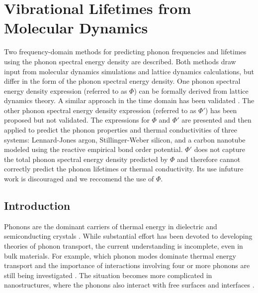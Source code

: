 \chapter{\label{Chapter:SED}Vibrational Lifetimes from Molecular Dynamics}

Two frequency-domain methods for predicting phonon frequencies and 
lifetimes
using the phonon spectral energy density are described. Both methods draw
input from molecular dynamics simulations and lattice dynamics 
calculations,
but differ in the form of the phonon spectral energy density.
One phonon spectral energy density expression (referred to as $\Phi$) 
can be
formally derived from lattice dynamics theory. A similar approach in the
time domain has been validated \cite{turney_predicting_2009}. 
The other phonon spectral energy density expression 
(referred to as
$\Phi'$) has been proposed \cite{thomas_predicting_2010}
but not validated. The expressions for $\Phi$ and $\Phi'$ are 
presented and then
applied to predict the phonon properties and thermal conductivities 
of three
systems: Lennard-Jones argon, Stillinger-Weber silicon, and a carbon
nanotube modeled using the reactive empirical bond order potential. 
$\Phi'$ does not capture the total
phonon spectral energy density predicted by $\Phi$ and therefore 
cannot
correctly predict the phonon lifetimes or thermal conductivity. Its 
use infuture work is discouraged and we reccomend the use of $\Phi$.

\section{\label{Section_Introduction}Introduction}
Phonons are the dominant carriers of thermal energy in dielectric
and semiconducting crystals 
\cite{cahill_nanoscale_2003,mcconnell_thermal_2005,
srivastava_physics_1990,wallace_thermodynamics_1972,
maradudin_dynamical_1974,dove_introduction_1993}. While
substantial effort has been devoted to developing theories of phonon
transport, the current understanding is incomplete, even in bulk 
materials. For
example, which phonon modes dominate thermal energy transport and the 
importance of
interactions involving four or more phonons are still being investigated 
\cite{wallace_thermodynamics_1972,srivastava_physics_1990,
broido_intrinsic_2007,esfarjani_heat_2011,cahill_nanoscale_2003}. The
situation becomes more complicated in nanostructures, where the phonons 
also interact with free surfaces and interfaces 
\cite{asheghi_phonon-boundary_1997,balandin_significant_1998,
lee_heat_1997,tian_importance_2011,hochbaum_enhanced_2008,
martin_impact_2009,he_thermal_2011,hopkins_reduction_2011,
landry_complex_2008,mcgaughey_size-dependent_2011,
landry_effect_2009,landry_thermal_2009,landry_effect_2010}.

